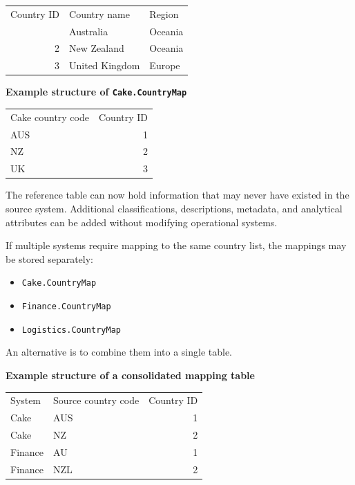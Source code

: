 \documentclass[10pt,openany,10pt]{book}
\providecommand{\tightlist}{%
  \setlength{\itemsep}{0pt}\setlength{\parskip}{0pt}}
\newcounter{none}
\let\podeToprule\toprule
\let\podeMidrule\midrule
\let\podeBottomrule\bottomrule
\renewcommand{\toprule}{\arrayrulecolor{pbiGrid}\podeToprule}
\renewcommand{\midrule}{\arrayrulecolor{pbiGrid}\podeMidrule}
\renewcommand{\bottomrule}{\arrayrulecolor{pbiGrid}\podeBottomrule}
\begin{document}
{\def\LTcaptype{none} %
\begin{longtable}[]{@{}rll@{}}
\toprule\noalign{}
Country ID & Country name & Region \\
\midrule\noalign{}
\endhead
\bottomrule\noalign{}
\endlastfoot
1 & Australia & Oceania \\
2 & New Zealand & Oceania \\
3 & United Kingdom & Europe \\
\end{longtable}
}

\textbf{Example structure of \texttt{Cake.CountryMap}}

{\def\LTcaptype{none} %
\begin{longtable}[]{@{}lr@{}}
\toprule\noalign{}
Cake country code & Country ID \\
\midrule\noalign{}
\endhead
\bottomrule\noalign{}
\endlastfoot
AUS & 1 \\
NZ & 2 \\
UK & 3 \\
\end{longtable}
}

The reference table can now hold information that may never have existed
in the source system. Additional classifications, descriptions,
metadata, and analytical attributes can be added without modifying
operational systems.

If multiple systems require mapping to the same country list, the
mappings may be stored separately:

\begin{itemize}
\tightlist
\item
  \texttt{Cake.CountryMap}
\item
  \texttt{Finance.CountryMap}
\item
  \texttt{Logistics.CountryMap}
\end{itemize}

An alternative is to combine them into a single table.

\textbf{Example structure of a consolidated mapping table}

{\def\LTcaptype{none} %
\begin{longtable}[]{@{}llr@{}}
\toprule\noalign{}
System & Source country code & Country ID \\
\midrule\noalign{}
\endhead
\bottomrule\noalign{}
\endlastfoot
Cake & AUS & 1 \\
Cake & NZ & 2 \\
Finance & AU & 1 \\
Finance & NZL & 2 \\
\end{longtable}
}
\end{document}
